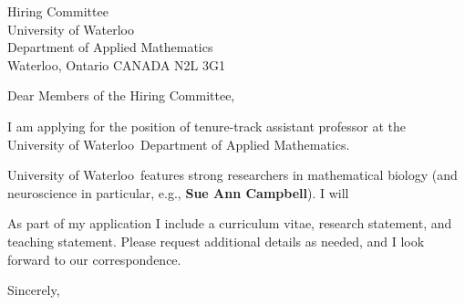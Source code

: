 \documentclass[11pt,a4paper]{letter}
\begin{document}
\def\School{University of Waterloo}
\begin{letter}
{Hiring Committee\\
University of Waterloo\\
Department of Applied Mathematics\\
Waterloo, Ontario CANADA N2L 3G1}


\opening{Dear Members of the Hiring Committee,}

I am applying for the position of tenure-track assistant professor at the \School~Department of Applied Mathematics. 



\School~features strong researchers in mathematical biology (and neuroscience in particular, e.g., \textbf{Sue Ann Campbell}). I will 



As part of my application I include a curriculum vitae, research statement, and teaching statement. Please request additional details as needed, and I look forward to our correspondence.

\closing{Sincerely,}
\end{letter}
\end{document}
